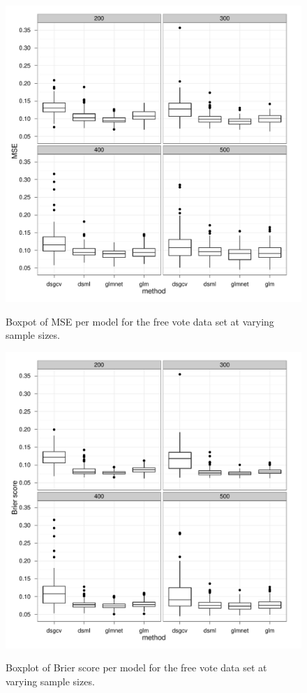 \begin{figure}
\centering
\includegraphics[width=6in]{gds/figs/mp-mse.pdf} \\
\caption{Boxpot of MSE per model for the free vote data set at varying sample sizes.}
\label{gds-mps-mse}
\end{figure}

\begin{figure}
\centering
\includegraphics[width=6in]{gds/figs/mp-brier.pdf} \\
\caption{Boxplot of Brier score per model for the free vote data set at varying sample sizes.}
\label{gds-mps-brier}
\end{figure}

